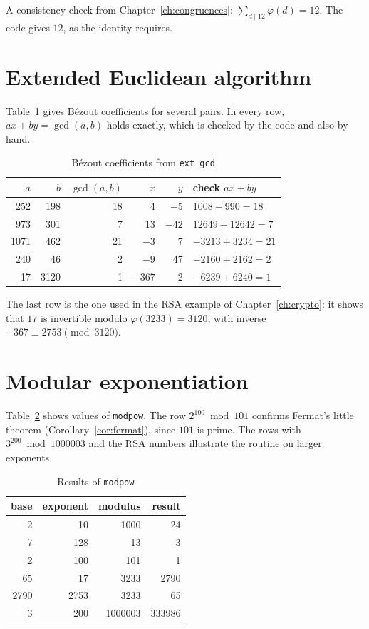 A consistency check from Chapter~\ref{ch:congruences}: $\sum_{d\mid 12}\varphi(d)=12$. The code gives $12$, as the identity requires.

\section{Extended Euclidean algorithm}

Table~\ref{tab:bezout} gives Bézout coefficients for several pairs. In every row, $ax+by=\gcd(a,b)$ holds exactly, which is checked by the code and also by hand.

\begin{table}[h]
\centering
\caption{Bézout coefficients from \texttt{ext\_gcd}}\label{tab:bezout}
\begin{tabular}{rrrrrl}
\hline
$a$ & $b$ & $\gcd(a,b)$ & $x$ & $y$ & check $ax+by$\\\hline
252 & 198 & 18 & 4 & $-5$ & $1008-990=18$\\
973 & 301 & 7 & 13 & $-42$ & $12649-12642=7$\\
1071 & 462 & 21 & $-3$ & 7 & $-3213+3234=21$\\
240 & 46 & 2 & $-9$ & 47 & $-2160+2162=2$\\
17 & 3120 & 1 & $-367$ & 2 & $-6239+6240=1$\\\hline
\end{tabular}
\end{table}

The last row is the one used in the RSA example of Chapter~\ref{ch:crypto}: it shows that $17$ is invertible modulo $\varphi(3233)=3120$, with inverse $-367\equiv 2753\pmod{3120}$.

\section{Modular exponentiation}

Table~\ref{tab:modpow} shows values of \texttt{modpow}. The row $2^{100}\bmod 101$ confirms Fermat's little theorem (Corollary~\ref{cor:fermat}), since $101$ is prime. The rows with $3^{200}\bmod 1000003$ and the RSA numbers illustrate the routine on larger exponents.

\begin{table}[h]
\centering
\caption{Results of \texttt{modpow}}\label{tab:modpow}
\begin{tabular}{rrrr}
\hline
base & exponent & modulus & result\\\hline
2 & 10 & 1000 & 24\\
7 & 128 & 13 & 3\\
2 & 100 & 101 & 1\\
65 & 17 & 3233 & 2790\\
2790 & 2753 & 3233 & 65\\
3 & 200 & 1000003 & 333986\\\hline
\end{tabular}
\end{table}

